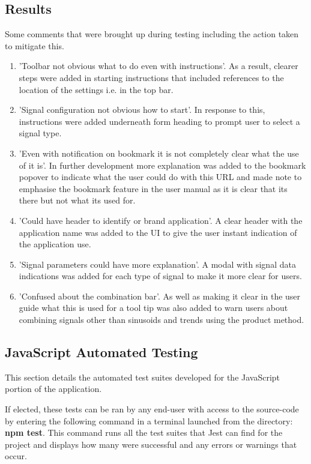 \subsection{Results}
Some comments that were brought up during testing including the action taken to mitigate this.
\begin{enumerate}
\item 'Toolbar not obvious what to do even with instructions'. As a result, clearer steps were added in starting instructions that included references to the location of the settings i.e. in the top bar.
\item 'Signal configuration not obvious how to start'. In response to this, instructions were added underneath form heading to prompt user to select a signal type.
\item 'Even with notification on bookmark it is not completely clear what the use of it is'. In further development more explanation was added to the bookmark popover to indicate what the user could do with this URL and made note to emphasise the bookmark feature in the user manual as it is clear that its there but not what its used for.
\item 'Could have header to identify or brand application'. A clear header with the application name was added to the UI to give the user instant indication of the application use.
\item 'Signal parameters could have more explanation'. A modal with signal data indications was added for each type of signal to make it more clear for users. 
\item 'Confused about the combination bar'. As well as making it clear in the user guide what this is used for a tool tip was also added to warn users about combining signals other than sinusoids and trends using the product method. 
\end{enumerate}

\subsection{JavaScript Automated Testing}
This section details the automated test suites developed for the JavaScript portion of the application. 

If elected, these tests can be ran by any end-user with access to the source-code by entering the following command in a terminal launched from the directory: {\bf npm test}. This command runs all the test suites that Jest can find for the project and displays how many were successful and any errors or warnings that occur. 

